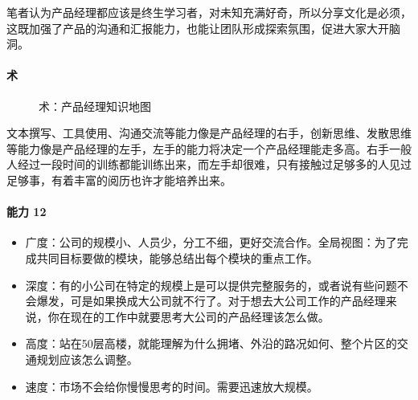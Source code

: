 \documentclass[letterpaper,11pt,english]{sphinxmanual}
\begin{document}
笔者认为产品经理都应该是终生学习者，对未知充满好奇，所以分享文化是必须，这既加强了产品的沟通和汇报能力，也能让团队形成探索氛围，促进大家大开脑洞。


\paragraph{术}
\label{\detokenize{chapter_introduction/ability:id7}}
\begin{figure}[H]
\centering
\capstart

\noindent{}
\caption{术：产品经理知识地图}\label{\detokenize{chapter_introduction/ability:id20}}\end{figure}

文本撰写、工具使用、沟通交流等能力像是产品经理的右手，创新思维、发散思维等能力像是产品经理的左手，左手的能力将决定一个产品经理能走多高。右手一般人经过一段时间的训练都能训练出来，而左手却很难，只有接触过足够多的人见过足够事，有着丰富的阅历也许才能培养出来。
%
\begin{footnote}[296]\sphinxAtStartFootnote
{}
%
\end{footnote}


\paragraph{能力 12\sphinxfootnotemark[297]}
\label{\detokenize{chapter_introduction/ability:id8}}%
\begin{footnotetext}[297]\sphinxAtStartFootnote
{}
%
\end{footnotetext}\ignorespaces \begin{itemize}
\item {} 
广度：公司的规模小、人员少，分工不细，更好交流合作。全局视图：为了完成共同目标要做的模块，能够总结出每个模块的重点工作。

\item {} 
深度：有的小公司在特定的规模上是可以提供完整服务的，或者说有些问题不会爆发，可是如果换成大公司就不行了。对于想去大公司工作的产品经理来说，你在现在的工作中就要思考大公司的产品经理该怎么做。

\item {} 
高度：站在50层高楼，就能理解为什么拥堵、外沿的路况如何、整个片区的交通规划应该怎么调整。

\item {} 
速度：市场不会给你慢慢思考的时间。需要迅速放大规模。

\end{itemize}
\end{document}
